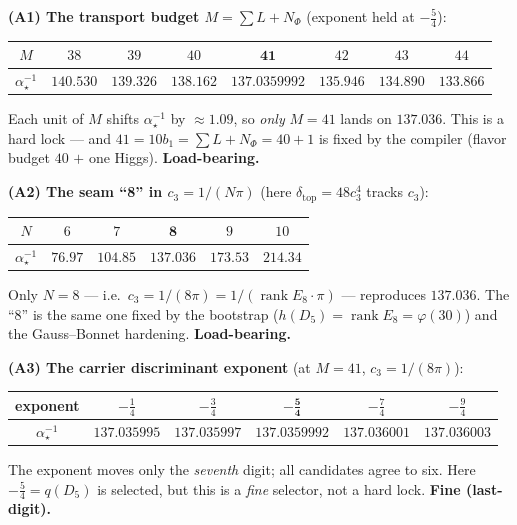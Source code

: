\documentclass[11pt,a4paper]{article}
\newcommand{\cthree}{c_3}
\newcommand{\dtop}{\delta_{\mathrm{top}}}
\newcommand{\ainv}{\alpha^{-1}_\star}
\theoremstyle{definition}
\renewcommand{\arraystretch}{1.15}
\begin{document}
\noindent\textbf{(A1) The transport budget $M=\sum L+N_\Phi$} (exponent held at $-\tfrac54$):
\begin{center}\footnotesize\renewcommand{\arraystretch}{1.15}
\begin{tabular}{@{}cccccccc@{}}
\toprule
$M$ & $38$ & $39$ & $40$ & $\mathbf{41}$ & $42$ & $43$ & $44$ \\
\midrule
$\ainv$ & $140.530$ & $139.326$ & $138.162$ & $\mathbf{137.0359992}$ & $135.946$ & $134.890$ & $133.866$ \\
\bottomrule
\end{tabular}
\end{center}
Each unit of $M$ shifts $\ainv$ by $\approx1.09$, so \emph{only} $M=41$ lands on $137.036$. This is a hard
lock --- and $41=10b_1=\sum L+N_\Phi=40+1$ is fixed by the compiler (flavor budget $40$ $+$ one Higgs).
\textbf{Load-bearing.}

\noindent\textbf{(A2) The seam ``8'' in $\cthree=1/(N\pi)$} (here $\dtop=48\cthree^4$ tracks $\cthree$):
\begin{center}\footnotesize\renewcommand{\arraystretch}{1.15}
\begin{tabular}{@{}cccccc@{}}
\toprule
$N$ & $6$ & $7$ & $\mathbf{8}$ & $9$ & $10$ \\
\midrule
$\ainv$ & $76.97$ & $104.85$ & $\mathbf{137.036}$ & $173.53$ & $214.34$ \\
\bottomrule
\end{tabular}
\end{center}
Only $N=8$ --- i.e.\ $\cthree=1/(8\pi)=1/(\operatorname{rank}E_8\cdot\pi)$ --- reproduces $137.036$. The
``8'' is the same one fixed by the bootstrap ($h(D_5)=\operatorname{rank}E_8=\varphi(30)$) and the
Gauss--Bonnet hardening. \textbf{Load-bearing.}

\noindent\textbf{(A3) The carrier discriminant exponent} (at $M=41$, $\cthree=1/(8\pi)$):
\begin{center}\footnotesize\renewcommand{\arraystretch}{1.15}
\begin{tabular}{@{}cccccc@{}}
\toprule
exponent & $-\tfrac14$ & $-\tfrac34$ & $\mathbf{-\tfrac54}$ & $-\tfrac74$ & $-\tfrac94$ \\
\midrule
$\ainv$ & $137.035995$ & $137.035997$ & $\mathbf{137.0359992}$ & $137.036001$ & $137.036003$ \\
\bottomrule
\end{tabular}
\end{center}
The exponent moves only the \emph{seventh} digit; all candidates agree to six. Here $-\tfrac54=q(D_5)$ is
selected, but this is a \emph{fine} selector, not a hard lock. \textbf{Fine (last-digit).}
\end{document}
